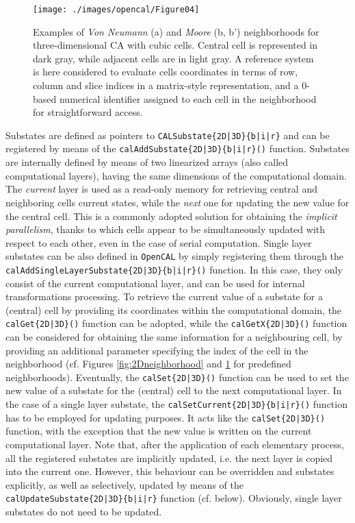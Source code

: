 \begin{figure}[!htbp]
	\begin{center}
		\texttt{[image: ./images/opencal/Figure04]}
		\caption[Examples of \textit{Von Neumann} and \textit{Moore} neighborhoods for three-dimensional CA with cubic cells.]{Examples of \textit{Von Neumann} (a) and \textit{Moore} (b, b') neighborhoods for three-dimensional CA with cubic cells. Central cell is represented in dark gray, while adjacent cells are in light gray. A reference system is here considered to evaluate cells coordinates in terms of row,
		column and slice indices in a matrix-style representation, and a
		0-based numerical identifier assigned to each cell in the neighborhood
		for straightforward access.}
		\label{fig:3Dneighborhood}
	\end{center}
\end{figure}
Substates are defined as pointers to
\verb'CALSubstate{2D|3D}{b|i|r}' and can be registered by means of
the \verb'calAddSubstate{2D|3D}{b|i|r}()' function. Substates are
internally defined by means of two linearized arrays (also called
computational layers), having the same dimensions of the
computational domain. The \emph{current} layer is used as a
read-only memory for retrieving central and neighboring cells
current states, while the \emph{next} one for updating the new value
for the central cell. This is a commonly adopted solution for
obtaining the \emph{implicit parallelism}, thanks to which cells
appear to be simultaneously updated with respect to each other, even
in the case of serial computation. Single layer substates can be
also defined in \texttt{OpenCAL} by simply registering them through the
\verb'calAddSingleLayerSubstate{2D|3D}{b|i|r}()' function. In this
case, they only consist of the current computational layer, and can
be used for internal transformations processing. To retrieve the
current value of a substate for a (central) cell by providing its
coordinates within the computational domain, the
\verb'calGet{2D|3D}()' function can be adopted, while the
\verb'calGetX{2D|3D}()' function can be considered for obtaining the
same information for a neighbouring cell, by providing an additional
parameter specifying the index of the cell in the neighborhood
(cf. Figures \ref{fig:2Dneighborhood} and \ref{fig:3Dneighborhood}
for predefined neighborhoods). Eventually, the
\verb'calSet{2D|3D}()' function can be used to set the new value of
a substate for the (central) cell to the next computational
layer. In the case of a single layer substate, the
\verb'calSetCurrent{2D|3D}{b|i|r}()' function has to be employed for
updating purposes. It acts like the \verb'calSet{2D|3D}()' function,
with the exception that the new value is written on the current
computational layer. Note that, after the application of each
elementary process, all the registered substates are implicitly
updated, i.e. the next layer is copied into the current
one. However, this behaviour can be overridden and substates
explicitly, as well as selectively, updated by means of the
\verb'calUpdateSubstate{2D|3D}{b|i|r}' function
(cf. below). Obviously, single layer substates do not need to be
updated.


